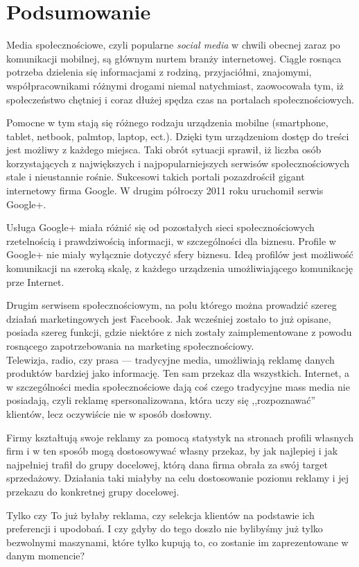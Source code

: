 \section{Podsumowanie}
\label{sec:podsumowanie}

Media społecznościowe, czyli popularne \textit{social media} w chwili obecnej zaraz po komunikacji mobilnej, są głównym nurtem branży internetowej. Ciągle rosnąca potrzeba dzielenia się informacjami z rodziną, przyjaciółmi, znajomymi, współpracownikami różnymi drogami niemal natychmiast, zaowocowała tym, iż społeczeństwo chętniej i coraz dłużej spędza czas na portalach społecznościowych. 

\noindent Pomocne w tym stają się różnego rodzaju urządzenia mobilne (smartphone, tablet, netbook, palmtop, laptop, ect.). Dzięki tym urządzeniom dostęp do treści jest możliwy z każdego miejsca. Taki obrót sytuacji sprawił, iż liczba osób korzystających z największych i najpopularniejszych serwisów społecznościowych stale i nieustannie rośnie. Sukcesowi takich portali pozazdrościł gigant internetowy firma Google. W drugim półroczy 2011 roku uruchomił serwis Google+.

Usługa Google+ miała różnić się od pozostałych sieci społecznościowych rzetelnością i prawdziwością informacji, w szczególności dla biznesu. Profile w Google+ nie miały wyłącznie dotyczyć sfery biznesu. Ideą profilów jest możliwość komunikacji na szeroką skalę, z każdego urządzenia umożliwiającego komunikację prze Internet.

Drugim serwisem społecznościowym, na polu którego można prowadzić szereg działań marketingowych jest Facebook. Jak wcześniej zostało to już opisane, posiada szereg funkcji, gdzie niektóre z nich zostały zaimplementowane z powodu rosnącego zapotrzebowania na marketing społecznościowy.\\

Telewizja, radio, czy prasa --- tradycyjne media, umożliwiają reklamę danych produktów bardziej jako informację. Ten sam przekaz dla wszystkich. Internet, a w szczególności media społecznościowe dają coś czego tradycyjne mass media nie posiadają, czyli reklamę spersonalizowana, która uczy się ,,rozpoznawać'' klientów, lecz oczywiście nie w sposób dosłowny.

\noindent Firmy kształtują swoje reklamy za pomocą statystyk na stronach profili własnych firm i w ten sposób mogą dostosowywać własny przekaz, by jak najlepiej i jak najpełniej trafił do grupy docelowej, którą dana firma obrała za swój target sprzedażowy. Działania taki miałyby na celu dostosowanie poziomu reklamy i jej przekazu do konkretnej grupy docelowej.

Tylko czy To już byłaby reklama, czy selekcja klientów na podstawie ich preferencji i upodobań. I czy gdyby do tego doszło nie bylibyśmy już tylko bezwolnymi maszynami, które tylko kupują to, co zostanie im zaprezentowane w danym momencie?